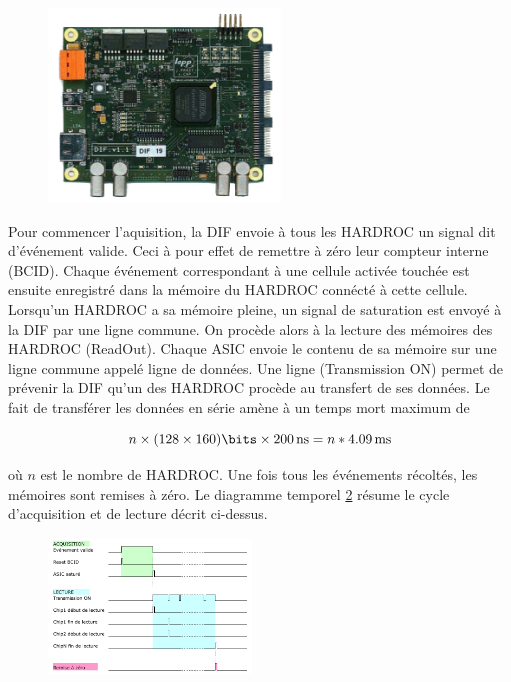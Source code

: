\begin{figure}[ht!]
	\centering
	\includegraphics[width=0.55\textwidth]{GLA/DIF.png}
	\label{DIF}
\end{figure}

Pour commencer l'aquisition, la DIF envoie à tous les HARDROC un signal dit d'événement valide. Ceci à pour effet de remettre à zéro leur compteur interne (BCID). Chaque événement correspondant à une cellule activée touchée est ensuite enregistré dans la mémoire du HARDROC connécté à cette cellule. Lorsqu'un HARDROC a sa mémoire pleine, un signal de saturation est envoyé à la DIF par une ligne commune. On procède alors à la lecture des mémoires des HARDROC (ReadOut). Chaque ASIC envoie le contenu de sa mémoire sur une ligne commune appelé ligne de données. Une ligne (Transmission ON) permet de prévenir la DIF qu'un des HARDROC procède au transfert de ses données. Le fait de transférer les données en série amène à un temps mort maximum de

\begin{equation}
n\times(128 \times 160)\si{\bits}\times \SI{200}{\nano\second}= n*\SI{4.09}{\milli\second}
\end{equation} 

où $n$ est le nombre de HARDROC. Une fois tous les événements récoltés, les mémoires sont remises à zéro. Le diagramme temporel \ref{temp} résume le cycle d'acquisition et de lecture décrit ci-dessus.

\begin{figure}[ht!]
	\centering
	\includegraphics[width=0.48\textwidth]{GLA/cycle.png}
	\label{temp}
\end{figure}

